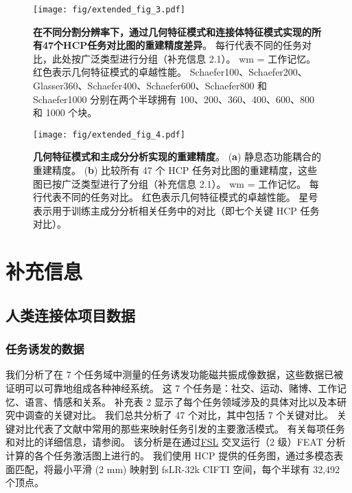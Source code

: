 \documentclass[lang=cn,a4paper,newtx]{elegantpaper}
\begin{document}
\begin{figure}[!htb] 
	\centering
	\texttt{[image: fig/extended\_fig\_3.pdf]}
	\caption{\textbf{在不同分割分辨率下，通过几何特征模式和连接体特征模式实现的所有47个HCP任务对比图的重建精度差异}。
	每行代表不同的任务对比，此处按广泛类型进行分组（补充信息 2.1）。
	wm = 工作记忆。
	红色表示几何特征模式的卓越性能。
	Schaefer100、Schaefer200、Glasser360、Schaefer400、Schaefer600、Schaefer800 和 Schaefer1000 分别在两个半球拥有 100、200、360、400、600、800 和 1000 个块。}
	\label{fig:extended_fig_3}
\end{figure}


\begin{figure}[!htb] 
	\centering
	\texttt{[image: fig/extended\_fig\_4.pdf]}
	\caption{\textbf{几何特征模式和主成分分析实现的重建精度}。
	(\textbf{a}) 静息态功能耦合的重建精度。
	(\textbf{b}) 比较所有 47 个 HCP 任务对比图的重建精度，这些图已按广泛类型进行了分组（补充信息 2.1）。
	wm = 工作记忆。
	每行代表不同的任务对比。
	红色表示几何特征模式的卓越性能。
	星号表示用于训练主成分分析相关任务中的对比（即七个关键 HCP 任务对比）。}
	\label{fig:extended_fig_4}
\end{figure}





\section{补充信息}

\subsection{人类连接体项目数据} \label{sec:sup_2}

\subsubsection{任务诱发的数据}

我们分析了在 7 个任务域中测量的任务诱发功能磁共振成像数据，这些数据已被证明可以可靠地组成各种神经系统\cite{barch2013function}。
这 7 个任务是：社交、运动、赌博、工作记忆、语言、情感和关系。
补充表 2 显示了每个任务领域涉及的具体对比以及本研究中调查的关键对比。
我们总共分析了 47 个对比，其中包括 7 个关键对比。
关键对比代表了文献中常用的那些来映射任务引发的主要激活模式。
有关每项任务和对比的详细信息，请参阅\cite{barch2013function}。
该分析是在通过\href{https://fsl.fmrib.ox.ac.uk/}{FSL} 交叉运行（2 级）FEAT 分析\cite{woolrich2004multilevel}计算的各个任务激活图上进行的。
我们使用 HCP 提供的任务图，通过多模态表面匹配\cite{robinson2018multimodal}，将最小平滑 (2 mm) 映射到 fsLR-32k CIFTI 空间，每个半球有 32,492 个顶点。
\end{document}
